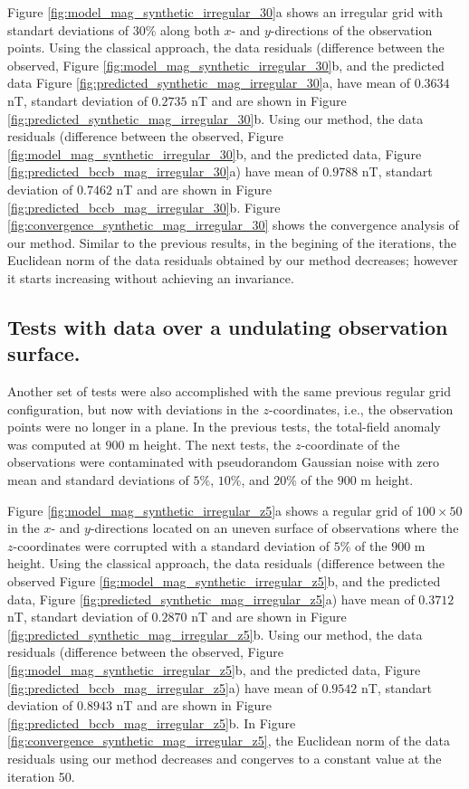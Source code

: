 Figure \ref{fig:model_mag_synthetic_irregular_30}a shows an irregular grid with standart deviations of $30\%$ along both $x$- and $y$-directions of the observation points. 
Using the classical approach, the data residuals (difference between the observed, 
Figure \ref{fig:model_mag_synthetic_irregular_30}b, and the predicted data 
Figure \ref{fig:predicted_synthetic_mag_irregular_30}a, have mean of $0.3634$ nT, standart deviation of $0.2735$ nT and are shown in Figure \ref{fig:predicted_synthetic_mag_irregular_30}b. 
Using our method, the data residuals (difference between the observed,
Figure \ref{fig:model_mag_synthetic_irregular_30}b, and the predicted data, 
Figure \ref{fig:predicted_bccb_mag_irregular_30}a)  have mean of $0.9788$ nT, standart deviation of $0.7462$ nT and are shown in Figure \ref{fig:predicted_bccb_mag_irregular_30}b.
Figure \ref{fig:convergence_synthetic_mag_irregular_30} shows the convergence analysis of our method.
Similar to the previous results, in the begining of the iterations, the Euclidean norm of the data residuals obtained by our method decreases; however it starts increasing without achieving an invariance.


\subsection*{Tests with data over a undulating observation surface.}

Another set of tests were also accomplished with the same previous regular grid configuration, but now with deviations in the $z$-coordinates, i.e., the observation points were no longer in a plane. 
In the previous tests, the total-field anomaly was computed at $900$ m height. 
The next tests, the $z$-coordinate of the observations were contaminated with 
pseudorandom Gaussian noise with zero mean and standard deviations of $5\%$, $10\%$, and $20\%$ of the $900$ m height.

Figure \ref{fig:model_mag_synthetic_irregular_z5}a shows a regular grid of $100 \times 50$ in the $x$- and $y$-directions located on an uneven surface of observations where  the $z$-coordinates were corrupted with a standard deviation of  $5\%$ of the $900$ m height. 
Using the classical approach, the data residuals (difference between the observed 
Figure \ref{fig:model_mag_synthetic_irregular_z5}b, and the predicted data, 
Figure \ref{fig:predicted_synthetic_mag_irregular_z5}a) have mean of $0.3712$ nT, standart deviation of $0.2870$ nT and are shown in Figure \ref{fig:predicted_synthetic_mag_irregular_z5}b. 
Using our method, the data residuals (difference between the observed, 
Figure  \ref{fig:model_mag_synthetic_irregular_z5}b, and the predicted data,
Figure \ref{fig:predicted_bccb_mag_irregular_z5}a) have mean of $0.9542$ nT, standart deviation of $0.8943$ nT and are shown in Figure \ref{fig:predicted_bccb_mag_irregular_z5}b.
In Figure \ref{fig:convergence_synthetic_mag_irregular_z5},  the Euclidean norm of the data residuals using our method decreases and  congerves to a constant value at the iteration 50. 

